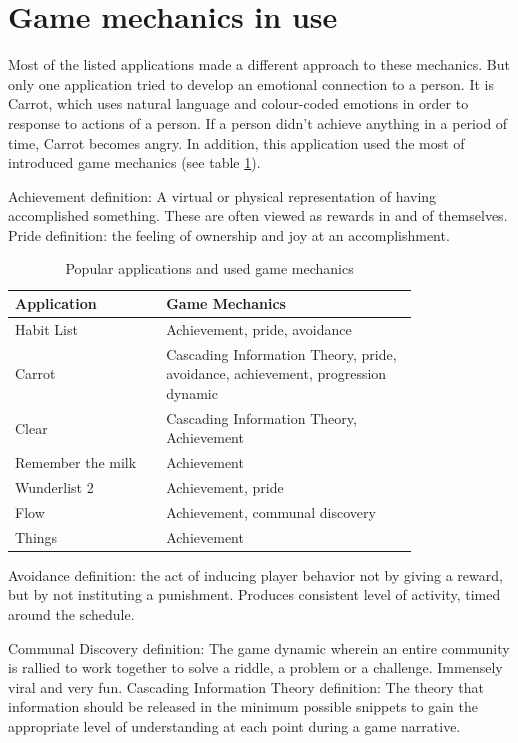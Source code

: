 \section{Game mechanics in use}

Most of the listed applications made a different approach to these mechanics. But only one application tried to develop an emotional connection to a person. It is Carrot, which uses natural language and colour-coded emotions in order to response to actions of a person. If a person didn’t achieve anything in a period of time, Carrot becomes angry. In addition, this application used the most of introduced game mechanics (see table \ref{tab:appsandmech}).

Achievement definition: A virtual or physical representation of having accomplished something. These are often viewed as rewards in and of themselves.
Pride definition: the feeling of ownership and joy at an accomplishment.

\begin{longtable}{|p{0.3\linewidth}|p{0.5\linewidth}|}
\caption{Popular applications and used game mechanics}
\label{tab:appsandmech}\\
\hline
\bf Application &  \bf Game Mechanics \\
\hline
\endhead
Habit List & Achievement, pride, avoidance \\
\hline
Carrot & Cascading Information Theory, pride, avoidance, achievement, progression dynamic \\
\hline
Clear & Cascading Information Theory, Achievement \\
\hline
Remember the milk & Achievement \\
\hline
Wunderlist 2 & Achievement, pride \\
\hline
Flow & Achievement, communal discovery \\
\hline
Things & Achievement\\
\hline
\end{longtable}

Avoidance definition:  the act of inducing player behavior not by giving a reward, but by not instituting a punishment. Produces consistent level of activity, timed around the schedule.

Communal Discovery definition: The game dynamic wherein an entire community is rallied to work together to solve a riddle, a problem or a challenge. Immensely viral and very fun.
Cascading Information Theory definition: The theory that information should be released in the minimum possible snippets to gain the appropriate level of understanding at each point during a game narrative.

